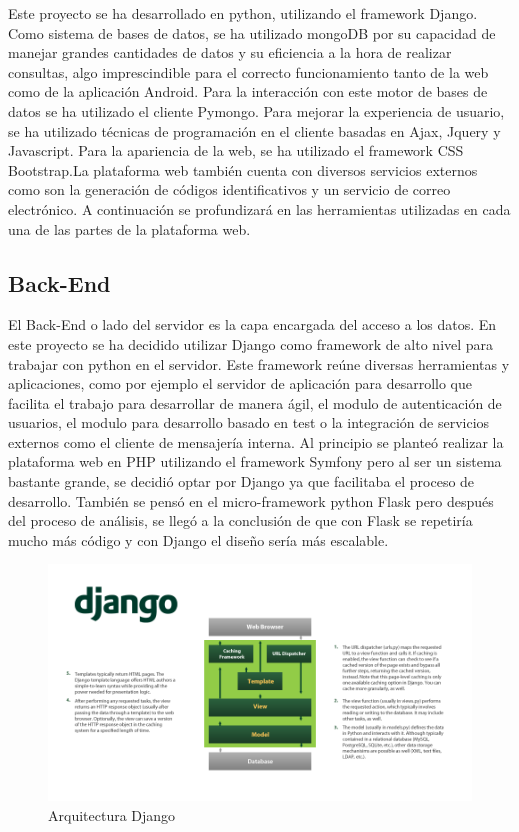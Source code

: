 \documentclass[a4paper,11pt]{book}
\begin{document}
Este proyecto se ha desarrollado en python, utilizando el framework Django. Como sistema de bases de datos, se ha utilizado mongoDB por su capacidad de manejar grandes cantidades de datos y su eficiencia a la hora de realizar consultas, algo imprescindible para el correcto funcionamiento tanto de la web como de la aplicación Android. Para la interacción con este motor de bases de datos se ha utilizado el cliente Pymongo. Para mejorar la experiencia de usuario, se ha utilizado técnicas de programación en el cliente basadas en Ajax, Jquery y Javascript. Para la apariencia de la web, se ha utilizado el framework CSS Bootstrap.La plataforma web también cuenta con diversos servicios externos como son la generación de códigos identificativos y un servicio de correo electrónico. A continuación se profundizará en las herramientas utilizadas en cada una de las partes de la plataforma web.

 



\subsection{Back-End}

El Back-End o lado del servidor es la capa encargada del acceso a los datos. En este proyecto se ha decidido utilizar Django\cite{dj} como framework de alto nivel para trabajar con python en el servidor. Este framework reúne diversas herramientas y aplicaciones, como por ejemplo el servidor de aplicación para desarrollo que facilita el trabajo para desarrollar de manera ágil, el modulo de autenticación de usuarios, el modulo para desarrollo basado en test o la integración de servicios externos como el cliente de mensajería interna. Al principio se planteó realizar la plataforma web en PHP utilizando el framework Symfony pero al ser un sistema bastante grande, se decidió optar por Django ya que facilitaba el proceso de desarrollo. También se pensó en el micro-framework python Flask\cite{fl} pero después del proceso de análisis, se llegó a la conclusión de que con Flask se repetiría mucho más código y con Django el diseño sería más escalable.

\begin{figure}[H] 
\centering 
\includegraphics[scale=0.55]{imagenes/desarrollo_herramienta/django.png}
\caption{ Arquitectura Django\cite{djA}  }  
\end{figure} 
\end{document}
